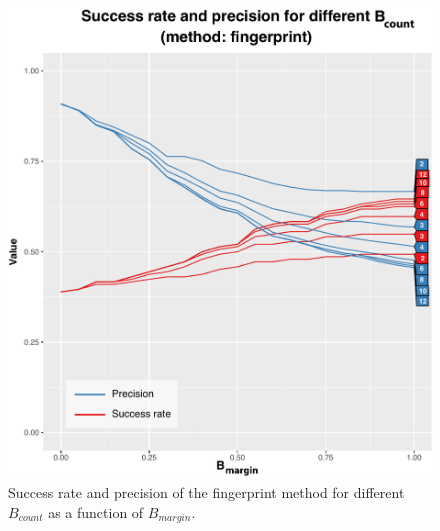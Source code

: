 \documentclass[thesis.tex]{subfiles}
\begin{document}
\begin{figure}
  \centering \includegraphics[page=1,width=\textwidth]{images/experiment/match_precision}
  \caption{Success rate and precision of the fingerprint method for different $B_{count}$ as a function of $B_{margin}$.}
  \label{figure:match_precision_fingerprint}
\end{figure}
\end{document}
